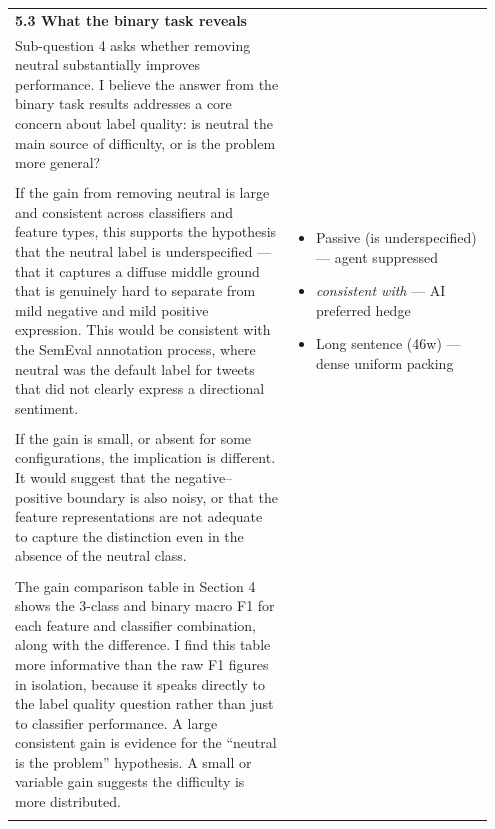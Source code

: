 \documentclass[11pt]{article}
\begin{document}
\begin{longtable}{|p{0.55\linewidth}|p{0.40\linewidth}|}
\hline
\rule[-3.5cm]{0pt}{3.5cm} & \\
\hline
\textbf{5.3 What the binary task reveals}\\[4pt]
Sub-question 4 asks whether removing neutral substantially improves performance. I believe the answer from the binary task results addresses a core concern about label quality: is neutral the main source of difficulty, or is the problem more general? &  \\[2pt]
\hline
\rule[-3.5cm]{0pt}{3.5cm} & \\
\hline
If the gain from removing neutral is large and consistent across classifiers and feature types, this supports the hypothesis that the neutral label is underspecified --- that it captures a diffuse middle ground that is genuinely hard to separate from mild negative and mild positive expression. This would be consistent with the SemEval annotation process, where neutral was the default label for tweets that did not clearly express a directional sentiment. & \begin{itemize}[leftmargin=1em,itemsep=1pt,topsep=1pt,parsep=0pt]
  \item Passive (is underspecified) --- agent suppressed
  \item \textit{consistent with} --- AI preferred hedge
  \item Long sentence (46w) --- dense uniform packing
\end{itemize} \\[2pt]
\hline
\rule[-3.5cm]{0pt}{3.5cm} & \\
\hline
If the gain is small, or absent for some configurations, the implication is different. It would suggest that the negative--positive boundary is also noisy, or that the feature representations are not adequate to capture the distinction even in the absence of the neutral class. &  \\[2pt]
\hline
\rule[-3.5cm]{0pt}{3.5cm} & \\
\hline
The gain comparison table in Section 4 shows the 3-class and binary macro F1 for each feature and classifier combination, along with the difference. I find this table more informative than the raw F1 figures in isolation, because it speaks directly to the label quality question rather than just to classifier performance. A large consistent gain is evidence for the ``neutral is the problem'' hypothesis. A small or variable gain suggests the difficulty is more distributed. &  \\[2pt]
\hline
\rule[-3.5cm]{0pt}{3.5cm} & \\

\end{longtable}
\end{document}

